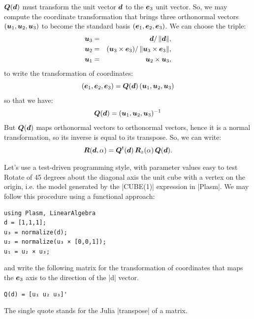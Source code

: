 ${\mbox{\boldmath $Q$}}({\mbox{\boldmath $d$}})$ must transform the unit vector ${\mbox{\boldmath $d$}}$ to the ${\mbox{\boldmath $e$}}_3$ unit vector. So, we may compute the coordinate transformation that brings three orthonormal vectors $({\mbox{\boldmath $u$}}_1, {\mbox{\boldmath $u$}}_2, {\mbox{\boldmath $u$}}_3)$ to become the standard basis $({\mbox{\boldmath $e$}}_1, {\mbox{\boldmath $e$}}_2, {\mbox{\boldmath $e$}}_3)$. We can choose the triple:
\begin{eqnarray}
{\mbox{\boldmath $u$}}_3 &=& {\mbox{\boldmath $d$}}/\,\|{\mbox{\boldmath $d$}}\|,\nonumber\\
{\mbox{\boldmath $u$}}_2 &=& ({\mbox{\boldmath $u$}}_3 \times {\mbox{\boldmath $e$}}_3)/\,\|{\mbox{\boldmath $u$}}_3 \times {\mbox{\boldmath $e$}}_3\|,\\
{\mbox{\boldmath $u$}}_1 &=& {\mbox{\boldmath $u$}}_2 \times {\mbox{\boldmath $u$}}_3,\nonumber
\end{eqnarray}
to write the transformation of coordinates:
\[
({\mbox{\boldmath $e$}}_1, {\mbox{\boldmath $e$}}_2, {\mbox{\boldmath $e$}}_3) = {\mbox{\boldmath $Q$}}({\mbox{\boldmath $d$}})\, ({\mbox{\boldmath $u$}}_1, {\mbox{\boldmath $u$}}_2, {\mbox{\boldmath $u$}}_3)
\]
so that we have:
\[
{\mbox{\boldmath $Q$}}({\mbox{\boldmath $d$}}) = ({\mbox{\boldmath $u$}}_1, {\mbox{\boldmath $u$}}_2, {\mbox{\boldmath $u$}}_3)^{-1}
\]
But ${\mbox{\boldmath $Q$}}({\mbox{\boldmath $d$}})$ maps orthonormal vectors to orthonormal vectors, hence it is a normal
transformation, so its inverse is equal to its transpose. So, we can write:
\begin{equation}
{\mbox{\boldmath $R$}}({\mbox{\boldmath $d$}},\alpha) = {\mbox{\boldmath $Q$}}^{t}({\mbox{\boldmath $d$}})\, {\mbox{\boldmath $R$}}_z(\alpha)\, {\mbox{\boldmath $Q$}}({\mbox{\boldmath $d$}}).
\end{equation}


\begin{coding}
Let’s use a test-driven programming style, with parameter values easy to test
Rotate of 45 degrees about the diagonal axis the unit cube with a vertex on the origin, i.e. the model generated by the |CUBE(1)| expression in |Plasm|. 
We may follow this procedure using a functional approach:

\begin{lstlisting}[language=JuliaLocal, style=julia, mathescape=false]
using Plasm, LinearAlgebra
d = [1,1,1];
u₃ = normalize(d);
u₂ = normalize(u₃ × [0,0,1]);
u₁ = u₂ × u₃;
\end{lstlisting}
and write the following matrix for the transformation of coordinates that maps the ${\mbox{\boldmath $e$}}_3$ axis to the direction of the |d| vector. 
\begin{lstlisting}[language=JuliaLocal, style=julia, mathescape=false]
Q(d) = [u₁ u₂ u₃]'
\end{lstlisting}
The single quote stands for the Julia |transpose| of a matrix.
\end{coding}


